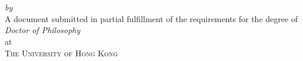 \begin{titlepage}
  \vspace*{5cm}
  \makeatletter
  \begin{center}
    \begin{Huge}
      \@title
    \end{Huge}\\[0.1cm]
    \begin{Large}
      \@subtitle
    \end{Large}\\
    \emph{by}\\
    \@author
    \vfill
    A document submitted in partial fulfillment
    of the requirements for the degree of\\
    \emph{Doctor of Philosophy}\\
    at\\
    \textsc{The University of Hong Kong}
  \end{center}
  \makeatother
\end{titlepage}

\newpage
\null
\thispagestyle{empty}
\newpage
